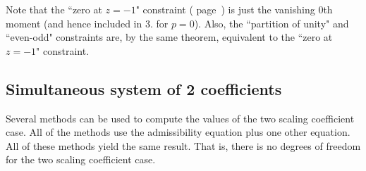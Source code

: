 Note that the ``zero at $z=-1$" constraint 
( page~\pageref{thm:zero_unity_evenodd})
is just the vanishing 0th moment (and hence included in 3. for $p=0$).
Also, the ``partition of unity" and ``even-odd" constraints 
are, by the same theorem, equivalent  to the 
``zero at $z=-1$" constraint.


\subsection {Simultaneous system of 2 coefficients}
\label{sec:sim_two}
Several methods can be used to compute the values of the 
two scaling coefficient case.
All of the methods use the admissibility equation plus one other equation.
All of these methods yield the same result.
That is, there is no degrees of freedom for the two scaling coefficient
case.

